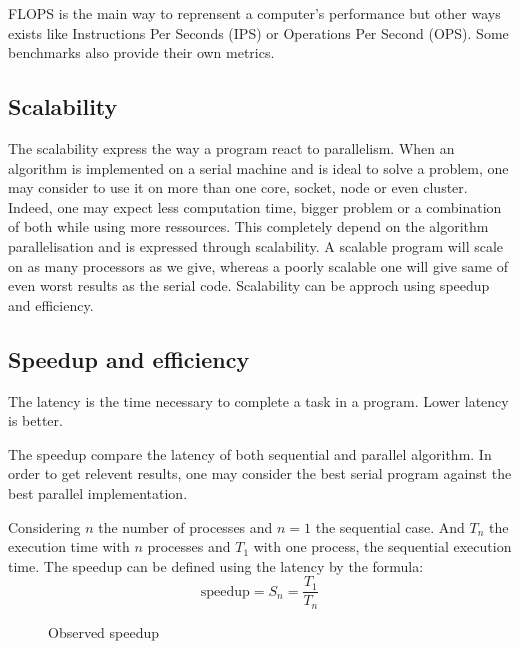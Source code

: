 	FLOPS is the main way to reprensent a computer's performance but other ways exists like Instructions Per Seconds (IPS) or Operations Per Second (OPS).
	Some benchmarks also provide their own metrics. 

	\subsection{Scalability}
	The scalability express the way a program react to parallelism. 
	When an algorithm is implemented on a serial machine and is ideal to solve a problem, one may consider to use it on more than one core, socket, node or even cluster. 
	Indeed, one may expect less computation time, bigger problem or a combination of both while using more ressources. 
	This completely depend on the algorithm parallelisation and is expressed through scalability. 
	A scalable program will scale on as many processors as we give, whereas a poorly scalable one will give same of even worst results as the serial code.  
	Scalability can be approch using speedup and efficiency.

	\subsection{Speedup and efficiency}
	The latency is the time necessary to complete a task in a program.
	Lower latency is better. 

	The speedup compare the latency of both sequential and parallel algorithm. 
	In order to get relevent results, one may consider the best serial program against the best parallel implementation.

	Considering $n$ the number of processes and $n=1$ the sequential case.
	And $T_n$ the execution time with $n$ processes and $T_1$ with one process, the sequential execution time. 
	The speedup can be defined using the latency by the formula: 
	\begin{equation}
	\text{speedup} = S_n =  \frac{T_1}{T_n}
	\end{equation}


	\begin{figure}
	\centering 
	\caption{Observed speedup}
	\label{fig:1_HPC:speedup_obs}
	\end{figure}

